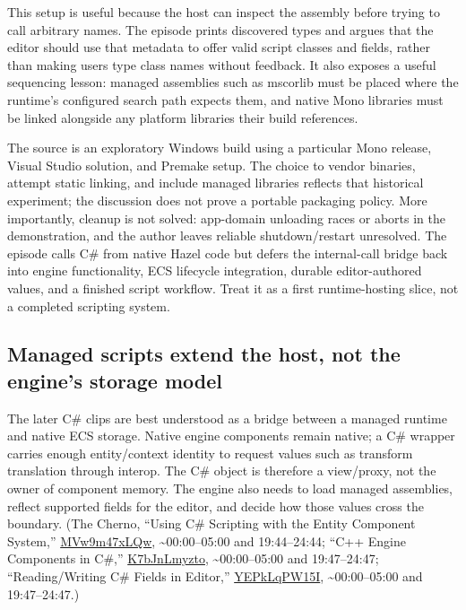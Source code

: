This setup is useful because the host can inspect the assembly before trying to call arbitrary names. The episode prints discovered types and argues that the editor should use that metadata to offer valid script classes and fields, rather than making users type class names without feedback. It also exposes a useful sequencing lesson: managed assemblies such as mscorlib must be placed where the runtime's configured search path expects them, and native Mono libraries must be linked alongside any platform libraries their build references.

The source is an exploratory Windows build using a particular Mono release, Visual Studio solution, and Premake setup. The choice to vendor binaries, attempt static linking, and include managed libraries reflects that historical experiment; the discussion does not prove a portable packaging policy. More importantly, cleanup is not solved: app-domain unloading races or aborts in the demonstration, and the author leaves reliable shutdown/restart unresolved. The episode calls C\# from native Hazel code but defers the internal-call bridge back into engine functionality, ECS lifecycle integration, durable editor-authored values, and a finished script workflow. Treat it as a first runtime-hosting slice, not a completed scripting system.

\subsection{Managed scripts extend the host, not the engine's storage model}\label{06-engine-ii-ch040-managed-scripts-extend-the-host-not-the-engines-storage-model}

\hypertarget{06-engine-ii-ch040-managed-scripts-extend-the-host-not-the-engines-storage-model}{}

The later C\# clips are best understood as a bridge between a managed runtime and native ECS storage. Native engine components remain native; a C\# wrapper carries enough entity/context identity to request values such as transform translation through interop. The C\# object is therefore a view/proxy, not the owner of component memory. The engine also needs to load managed assemblies, reflect supported fields for the editor, and decide how those values cross the boundary. (The Cherno, ``Using C\# Scripting with the Entity Component System,'' \href{https://www.youtube.com/watch?v=MVw9m47xLQw}{MVw9m47xLQw}, \textasciitilde00:00--05:00 and 19:44--24:44; ``C++ Engine Components in C\#,'' \href{https://www.youtube.com/watch?v=K7bJnLmyzto}{K7bJnLmyzto}, \textasciitilde00:00--05:00 and 19:47--24:47; ``Reading/Writing C\# Fields in Editor,'' \href{https://www.youtube.com/watch?v=YEPkLqPW15I}{YEPkLqPW15I}, \textasciitilde00:00--05:00 and 19:47--24:47.)

